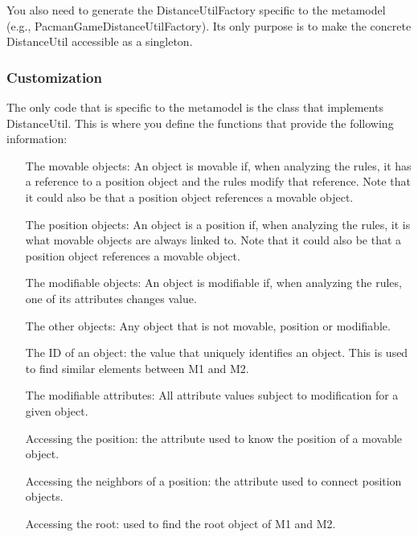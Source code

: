 You also need to generate the DistanceUtilFactory specific to the metamodel (e.g., PacmanGameDistanceUtilFactory). Its only purpose is to make the concrete DistanceUtil accessible as a singleton.

\subsubsection{Customization}

The only code that is specific to the metamodel is the class that implements DistanceUtil. This is where you define the functions that provide the following information:

\begin{itemize}
	\item[The movable objects:] An object is movable if, when analyzing the rules, it has a reference to a position object and the rules modify that reference. Note that it could also be that a position object references a movable object.
	\item[The position objects:] An object is a position if, when analyzing the rules, it is what movable objects are always linked to. Note that it could also be that a position object references a movable object.
	\item[The modifiable objects:] An object is modifiable if, when analyzing the rules, one of its attributes changes value.
	\item[The other objects:] Any object that is not movable, position or modifiable.
	\item[The ID of an object:] the value that uniquely identifies an object. This is used to find similar elements between M1 and M2.
	\item[The modifiable attributes:] All attribute values subject to modification for a given object.
	\item[Accessing the position:] the attribute used to know the position of a movable object.
	\item[Accessing the neighbors of a position:] the attribute used to connect position objects.
	\item[Accessing the root:] used to find the root object of M1 and M2.
\end{itemize}